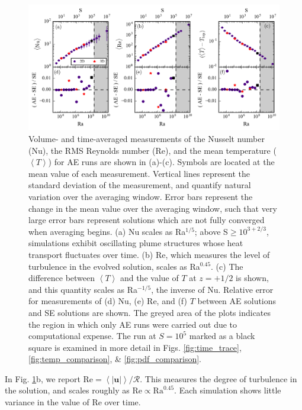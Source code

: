 \documentclass[aps, pre, onecolumn, nofootinbib, notitlepage, groupedaddress, amsfonts, amssymb, amsmath, longbibliography]{revtex4-1}
\newcommand{\angles}[1]{\ensuremath{\left\langle #1 \right\rangle}}
\begin{document}
\begin{figure}[b]
\includegraphics[width=\textwidth]{./figs/parameter_space_comparison.png}
\caption{Volume- and time-averaged measurements of the Nusselt number (Nu), the
RMS Reynolds number (Re), and the mean temperature ($\angles{T}$) for AE runs are shown in (a)-(c).
Symbols are located at the mean value of
each measurement.  Vertical lines represent the standard deviation of the measurement,
and quantify natural variation over the
averaging window. Error bars represent the change in the mean value over the averaging window,
such that very large error bars represent solutions which are not fully converged when averaging
begins.
(a) Nu scales as Ra$^{1/5}$; above S$\geq 10^{3+2/3}$,
simulations exhibit oscillating plume structures whose heat transport fluctuates over time.  
(b) Re, which measures the level of turbulence in the evolved solution, scales as
Ra$^{0.45}$. (c) The difference between $\angles{T}$ and the value of $T$ at $z = +1/2$
is shown, and this quantity scales as Ra$^{-1/5}$, the inverse of Nu.
Relative error for measurements of (d) Nu, (e) Re, and (f) $T$ between 
AE solutions and SE solutions are shown.
The greyed area of the plots indicates the region in which only AE runs were
carried out due to computational expense. The run at $S = 10^5$ marked as a
black square is examined in more detail in Figs. \ref{fig:time_trace},
\ref{fig:temp_comparison}, \& \ref{fig:pdf_comparison}.
\label{fig:parameter_space_comparison} }
\end{figure}



In Fig. \ref{fig:parameter_space_comparison}b, we report 
$\text{Re} = \angles{|\bm{u}|} / \mathcal{R}$.  This measures the degree of
turbulence in the solution, and scales roughly as
$\text{Re} \propto \text{Ra}^{0.45}$. Each simulation shows little variance in
the value of Re over time.
\end{document}
